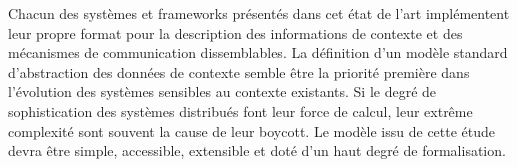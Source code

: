 Chacun des systèmes et frameworks présentés dans cet état de l'art implémentent
leur propre format pour la description des informations de contexte et des
mécanismes de communication dissemblables. La définition d'un modèle standard
d'abstraction des données de contexte semble être la priorité première dans
l'évolution des systèmes sensibles au contexte existants. Si le degré de
sophistication des systèmes distribués font leur force de calcul, leur
extrême complexité sont souvent la cause de leur boycott. Le modèle issu de
cette étude devra être simple, accessible, extensible et doté d'un haut degré de
formalisation.

